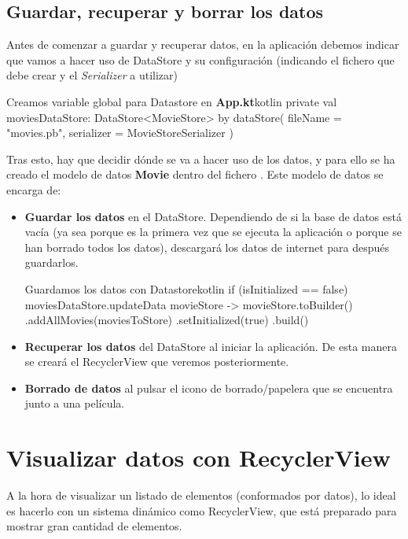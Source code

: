 \documentclass{\ClassPath/viu-tfm-template}
\begin{document}
\subsection{Guardar, recuperar y borrar los datos}

Antes de comenzar a guardar y recuperar datos, en la aplicación debemos indicar que vamos a hacer uso de DataStore y su configuración (indicando el fichero que debe crear y el \textit{Serializer} a utilizar)

\begin{mycode}{Creamos variable global para Datastore en \textbf{App.kt}}{kotlin}{}
private val moviesDataStore: DataStore<MovieStore> by dataStore(
    fileName = "movies.pb",
    serializer = MovieStoreSerializer
)
\end{mycode}

Tras esto, hay que decidir dónde se va a hacer uso de los datos, y para ello se ha creado el modelo de datos \textbf{Movie} dentro del fichero . Este modelo de datos se encarga de:

\begin{itemize}
    \item \textbf{Guardar los datos} en el DataStore. Dependiendo de si la base de datos está vacía (ya sea porque es la primera vez que se ejecuta la aplicación o porque se han borrado todos los datos), descargará los datos de internet para después guardarlos.
\begin{mycode}{Guardamos los datos con Datastore}{kotlin}{}
if (isInitialized == false) {
    moviesDataStore.updateData { movieStore ->
        movieStore.toBuilder()
        .addAllMovies(moviesToStore)
        .setInitialized(true)
        .build()
    }
}
\end{mycode}
    \item \textbf{Recuperar los datos} del DataStore al iniciar la aplicación. De esta manera se creará el RecyclerView que veremos posteriormente.

    \item \textbf{Borrado de datos} al pulsar el icono de borrado/papelera que se encuentra junto a una película.
\end{itemize}


\section{Visualizar datos con RecyclerView}

A la hora de visualizar un listado de elementos (conformados por datos), lo ideal es hacerlo con un sistema dinámico como RecyclerView, que está preparado para mostrar gran cantidad de elementos.
\end{document}
